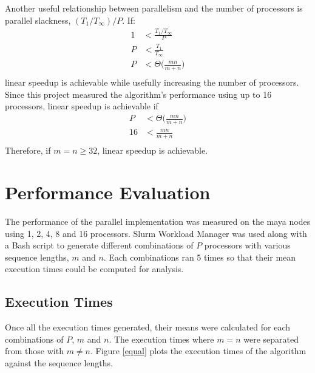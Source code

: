 \documentclass[usletter, 11pt]{extarticle}
\begin{document}
        Another useful relationship between parallelism and the number of
        processors is parallel slackness, $(T_1/T_\infty)/P$. If:
        \begin{equation*}
            \begin{split}
                1 & < \frac{T_1/T_\infty}{P} \\
                P & < \frac{T_1}{T_\infty} \\
                P & < \Theta\Bigg(\frac{mn}{m+n}\Bigg) \\
            \end{split}
        \end{equation*}
        linear speedup is achievable while usefully increasing the number of
        processors. Since this project measured the algorithm's performance
        using up to 16 processors, linear speedup is achievable if
        \begin{equation*}
            \begin{split}
                P & < \Theta\Bigg(\frac{mn}{m+n}\Bigg) \\
                16 & < \frac{mn}{m+n} \\
            \end{split}
        \end{equation*}
        Therefore, if $m=n\ge32$, linear speedup is achievable.

    \section{Performance Evaluation} The performance of the parallel
    implementation was measured on the maya nodes using 1, 2, 4, 8 and 16
    processors. Slurm Workload Manager was used along with a Bash script to
    generate different combinations of $P$ processors with various sequence
    lengths, $m$ and $n$. Each combinations ran 5 times so that their mean
    execution times could be computed for analysis.

        \subsection{Execution Times} Once all the execution times generated,
        their means were calculated for each combinations of $P$, $m$ and $n$.
        The execution times where $m = n$ were separated from those with $m \ne
        n$. Figure \ref{equal} plots the execution times of the algorithm
        against the sequence lengths.
\end{document}
